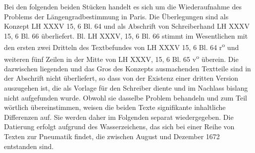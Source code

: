 \pstart Bei den folgenden beiden St\"{u}cken handelt es sich um die Wiederaufnahme des Problems der L\"{a}ngengradbestimmung in Paris. Die \"{U}berlegungen sind als Konzept LH XXXV 15, 6 Bl. 64 und als Abschrift von Schreiberhand LH XXXV 15, 6 Bl. 66 \"{u}berliefert. Bl. LH XXXV, 15, 6 Bl. 66 stimmt im Wesentlichen mit den ersten zwei Dritteln des Textbefundes von LH XXXV 15, 6 Bl. 64 r\textsuperscript{o} und weiteren f\"{u}nf Zeilen in der Mitte von LH XXXV, 15, 6 Bl. 65 v\textsuperscript{o} \"{u}berein. Die dazwischen liegenden und das Gros des Konzepts ausmachenden Textteile sind in der Abschrift nicht \"{u}berliefert, so dass von der Existenz einer dritten Version auszugehen ist, die als Vorlage f\"{u}r den Schreiber diente und im Nachlass bislang nicht aufgefunden wurde. Obwohl sie dasselbe Problem behandeln und zum Teil w\"{o}rtlich \"{u}bereinstimmen, weisen die beiden Texte signifikante inhaltliche Differenzen auf. Sie werden daher im Folgenden separat wiedergegeben. Die Datierung erfolgt aufgrund des Wasserzeichens, das sich bei einer Reihe von Texten zur Pneumatik findet, die zwischen August und Dezember 1672 entstanden sind.\pend